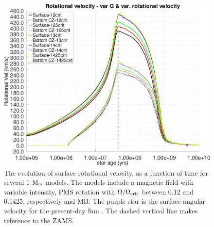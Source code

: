 \documentclass[fleqn,usenatbib]{mnras}
\begin{document}
\begin{ceqn}
\begin{figure}
	\includegraphics[clip,width=\columnwidth]{figures/paper2/rot_vel_var_vel_var_g3.pdf}
    \caption{The evolution of surface rotational velocity, as a function of time for several 1 $\mathrm{M}_\odot$ models. The models include a magnetic field with variable intensity, PMS rotation with $\Omega / \Omega_{\mathrm{crit}}$ between 0.12 and 0.1425, respectively and MB. The purple star is the surface angular velocity for the present-day Sun \citep{Gill2012}. The dashed vertical line makes reference to the ZAMS.}
    \label{fig:rot_vel_var_vel_var_g3}
\end{figure}


\end{ceqn}
\end{document}
